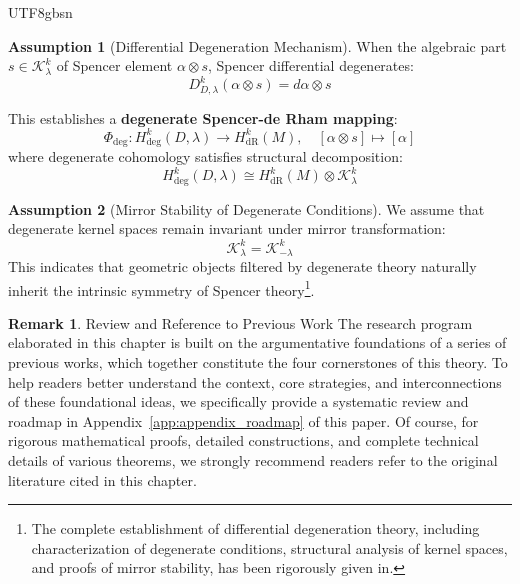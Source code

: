 \documentclass[a4paper,12pt]{extarticle}
\theoremstyle{definition}
\newtheorem{remark}{Remark}[section]
\newtheorem{assumption}{Assumption}[theorem]
\begin{document}
\begin{CJK}{UTF8}{gbsn}
\begin{assumption}[Differential Degeneration Mechanism]
When the algebraic part $s \in \mathcal{K}^k_\lambda$ of Spencer element $\alpha \otimes s$, Spencer differential degenerates:
\begin{equation}
\label{eq:differential_degeneration}
D^k_{D,\lambda}(\alpha \otimes s) = d\alpha \otimes s
\end{equation}

This establishes a \textbf{degenerate Spencer-de Rham mapping}:
\begin{equation}
\label{eq:degenerate_spencer_de_rham_map}
\Phi_{\text{deg}}: H^k_{\text{deg}}(D,\lambda) \to H^k_{\text{dR}}(M), \quad [\alpha \otimes s] \mapsto [\alpha]
\end{equation}
where degenerate cohomology satisfies structural decomposition:
\begin{equation}
\label{eq:degenerate_cohomology_structure}
H^k_{\text{deg}}(D, \lambda) \cong H^k_{\text{dR}}(M) \otimes \mathcal{K}^k_\lambda
\end{equation}
\end{assumption}

\begin{assumption}[Mirror Stability of Degenerate Conditions]
\label{assumption:degenerate_mirror_stability}
We assume that degenerate kernel spaces remain invariant under mirror transformation:
\begin{equation}
\label{eq:kernel_mirror_invariance}
\mathcal{K}^k_\lambda = \mathcal{K}^k_{-\lambda}
\end{equation}
This indicates that geometric objects filtered by degenerate theory naturally inherit the intrinsic symmetry of Spencer theory\footnote{The complete establishment of differential degeneration theory, including characterization of degenerate conditions, structural analysis of kernel spaces, and proofs of mirror stability, has been rigorously given in\cite{zheng2025spencerdifferentialdegenerationtheory}.}.
\end{assumption}

\begin{remark}{Review and Reference to Previous Work}
The research program elaborated in this chapter is built on the argumentative foundations of a series of previous works, which together constitute the four cornerstones of this theory. To help readers better understand the context, core strategies, and interconnections of these foundational ideas, we specifically provide a systematic review and roadmap in Appendix~\ref{app:appendix_roadmap} of this paper. Of course, for rigorous mathematical proofs, detailed constructions, and complete technical details of various theorems, we strongly recommend readers refer to the original literature cited in this chapter.
\end{remark}


\end{CJK}
\end{document}
